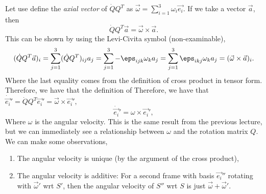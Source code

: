 Let use define the \emph{axial vector} of $\dot{Q}Q^T$ as
$\vec{\omega}=\sum_{i=1}^3 \omega_i \vec{e_i}$. If we take a vector $\vec{a}$,
then 
\[\dot{Q}Q^T \vec{a}=\vec{\omega}\times\vec{a}.\]
This can be shown by using the Levi-Civita symbol (non-examinable),
\[(\dot{Q}Q^T\vec{a})_i = \sum_{j=1}^3 (\dot{Q}Q^T)_{ij}a_j =
\sum_{j=1}^3-\eps_{ijk}\omega_k a_j = \sum_{j=1}^3\eps_{ikj}\omega_k a_j =
(\vec{\omega}\times\vec{a})_i.\]
Where the last equality comes from the definition of cross product in tensor
form. Therefore, we have that the definition of  Therefore, we have that
$\dot{\vec{e_i}}'=\dot{Q}Q^T \vec{e_i}'= \vec{\omega}\times\vec{e_i}',$
\[\dot{\vec{e_i}}' =\omega\times\vec{e_i}',\]
Where $\omega$ is the angular velocity. This is the same result from the
previous lecture, but we can immediately see a relationship between $\omega$ and
the rotation matrix $Q$. We can make some observations,
\begin{enumerate}
  \item The angular velocity is unique (by the argument of the cross product),
  \item The angular velocity is additive: For a second frame with basis
    $\vec{e_i}''$ rotating with $\vec{\omega}'$ wrt $S'$, then the angular
    velocity of $S''$ wrt $S$ is just $\vec{\omega}+\vec{\omega}'$.
\end{enumerate}

